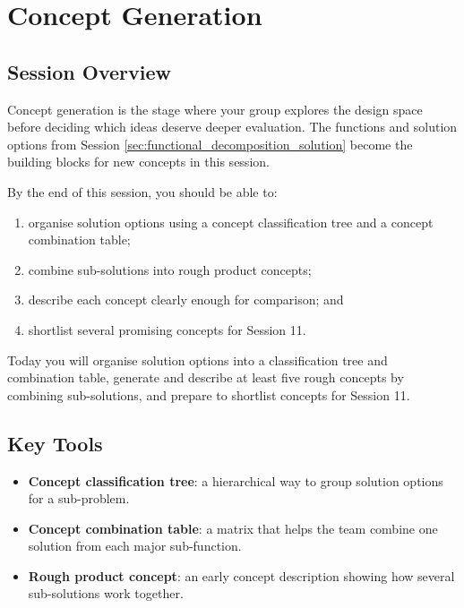 \chapter{Concept Generation}
\label{ch:concept_generation}
\section{Session Overview}

Concept generation is the stage where your group explores the design space before deciding which ideas deserve deeper evaluation. The functions and solution options from Session \ref{sec:functional_decomposition_solution} become the building blocks for new concepts in this session.

By the end of this session, you should be able to:
\begin{enumerate}
    \item organise solution options using a concept classification tree and a concept combination table;
    \item combine sub-solutions into rough product concepts;
    \item describe each concept clearly enough for comparison; and
    \item shortlist several promising concepts for Session 11.
\end{enumerate}

\begin{tcolorbox}[title=Goal]
Today you will organise solution options into a classification tree and combination table, generate and describe at least five rough concepts by combining sub-solutions, and prepare to shortlist concepts for Session 11.
\end{tcolorbox}

\section{Key Tools}

\begin{itemize}
    \item \textbf{Concept classification tree}: a hierarchical way to group solution options for a sub-problem.
    \item \textbf{Concept combination table}: a matrix that helps the team combine one solution from each major sub-function.
    \item \textbf{Rough product concept}: an early concept description showing how several sub-solutions work together.
\end{itemize}

